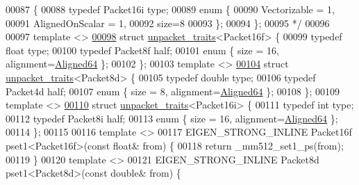\begin{DoxyCode}
00087 \textcolor{comment}{\{}
00088 \textcolor{comment}{  typedef Packet16i type;}
00089 \textcolor{comment}{  enum \{}
00090 \textcolor{comment}{    Vectorizable = 1,}
00091 \textcolor{comment}{    AlignedOnScalar = 1,}
00092 \textcolor{comment}{    size=8}
00093 \textcolor{comment}{  \};}
00094 \textcolor{comment}{\};}
00095 \textcolor{comment}{*/}
00096 
00097 \textcolor{keyword}{template} <>
\hyperlink{struct_eigen_1_1internal_1_1unpacket__traits_3_01_packet16f_01_4}{00098} \textcolor{keyword}{struct }\hyperlink{struct_eigen_1_1internal_1_1unpacket__traits}{unpacket\_traits}<Packet16f> \{
00099   \textcolor{keyword}{typedef} \textcolor{keywordtype}{float} type;
00100   \textcolor{keyword}{typedef} Packet8f half;
00101   \textcolor{keyword}{enum} \{ size = 16, alignment=\hyperlink{group__enums_gga45fe06e29902b7a2773de05ba27b47a1a0f4f4451618a2e67cade6b54ca0fc84b}{Aligned64} \};
00102 \};
00103 \textcolor{keyword}{template} <>
\hyperlink{struct_eigen_1_1internal_1_1unpacket__traits_3_01_packet8d_01_4}{00104} \textcolor{keyword}{struct }\hyperlink{struct_eigen_1_1internal_1_1unpacket__traits}{unpacket\_traits}<Packet8d> \{
00105   \textcolor{keyword}{typedef} \textcolor{keywordtype}{double} type;
00106   \textcolor{keyword}{typedef} Packet4d half;
00107   \textcolor{keyword}{enum} \{ size = 8, alignment=\hyperlink{group__enums_gga45fe06e29902b7a2773de05ba27b47a1a0f4f4451618a2e67cade6b54ca0fc84b}{Aligned64} \};
00108 \};
00109 \textcolor{keyword}{template} <>
\hyperlink{struct_eigen_1_1internal_1_1unpacket__traits_3_01_packet16i_01_4}{00110} \textcolor{keyword}{struct }\hyperlink{struct_eigen_1_1internal_1_1unpacket__traits}{unpacket\_traits}<Packet16i> \{
00111   \textcolor{keyword}{typedef} \textcolor{keywordtype}{int} type;
00112   \textcolor{keyword}{typedef} Packet8i half;
00113   \textcolor{keyword}{enum} \{ size = 16, alignment=\hyperlink{group__enums_gga45fe06e29902b7a2773de05ba27b47a1a0f4f4451618a2e67cade6b54ca0fc84b}{Aligned64} \};
00114 \};
00115 
00116 \textcolor{keyword}{template} <>
00117 EIGEN\_STRONG\_INLINE Packet16f pset1<Packet16f>(\textcolor{keyword}{const} \textcolor{keywordtype}{float}& from) \{
00118   \textcolor{keywordflow}{return} \_mm512\_set1\_ps(from);
00119 \}
00120 \textcolor{keyword}{template} <>
00121 EIGEN\_STRONG\_INLINE Packet8d pset1<Packet8d>(\textcolor{keyword}{const} \textcolor{keywordtype}{double}& from) \{

\end{DoxyCode}
